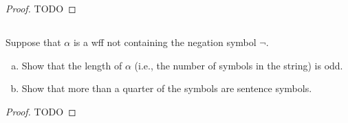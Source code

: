 \documentclass{report}
\begin{document}
  \begin{proof}
    TODO
  \end{proof}

\subsection{}%

  Suppose that $\alpha$ is a wff not containing the negation symbol $\neg$.
  \begin{enumerate}[(a)]
    \item Show that the length of $\alpha$ (i.e., the number of symbols in the
      string) is odd.
    \item Show that more than a quarter of the symbols are sentence symbols.
  \end{enumerate}

  \begin{proof}
    TODO
  \end{proof}
\end{document}
